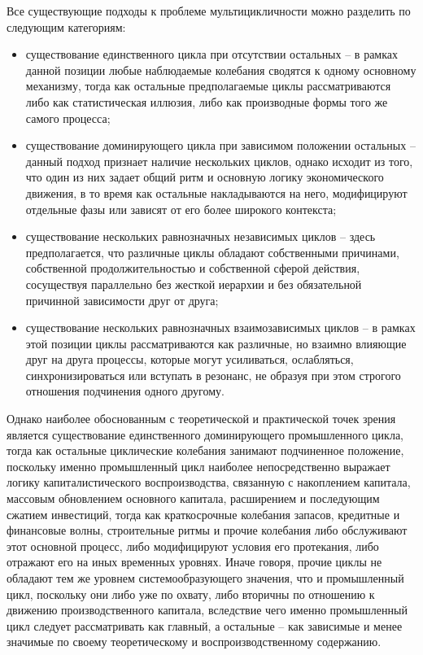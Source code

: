 Все существующие подходы к проблеме мультицикличности можно разделить по следующим категориям:
\begin{itemize}
    \item существование единственного цикла при отсутствии остальных – в рамках данной позиции любые наблюдаемые колебания сводятся к одному основному механизму, тогда как остальные предполагаемые циклы рассматриваются либо как статистическая иллюзия, либо как производные формы того же самого процесса;
    \item существование доминирующего цикла при зависимом положении остальных – данный подход признает наличие нескольких циклов, однако исходит из того, что один из них задает общий ритм и основную логику экономического движения, в то время как остальные накладываются на него, модифицируют отдельные фазы или зависят от его более широкого контекста;
    \item существование нескольких равнозначных независимых циклов – здесь предполагается, что различные циклы обладают собственными причинами, собственной продолжительностью и собственной сферой действия, сосуществуя параллельно без жесткой иерархии и без обязательной причинной зависимости друг от друга;
    \item существование нескольких равнозначных взаимозависимых циклов – в рамках этой позиции циклы рассматриваются как различные, но взаимно влияющие друг на друга процессы, которые могут усиливаться, ослабляться, синхронизироваться или вступать в резонанс, не образуя при этом строгого отношения подчинения одного другому.
\end{itemize}

Однако наиболее обоснованным с теоретической и практической точек зрения является существование единственного доминирующего промышленного цикла, тогда как остальные циклические колебания занимают подчиненное положение, поскольку именно промышленный цикл наиболее непосредственно выражает логику капиталистического воспроизводства, связанную с накоплением капитала, массовым обновлением основного капитала, расширением и последующим сжатием инвестиций, тогда как краткосрочные колебания запасов, кредитные и финансовые волны, строительные ритмы и прочие колебания либо обслуживают этот основной процесс, либо модифицируют условия его протекания, либо отражают его на иных временных уровнях. Иначе говоря, прочие циклы не обладают тем же уровнем системообразующего значения, что и промышленный цикл, поскольку они либо уже по охвату, либо вторичны по отношению к движению производственного капитала, вследствие чего именно промышленный цикл следует рассматривать как главный, а остальные – как зависимые и менее значимые по своему теоретическому и воспроизводственному содержанию.

